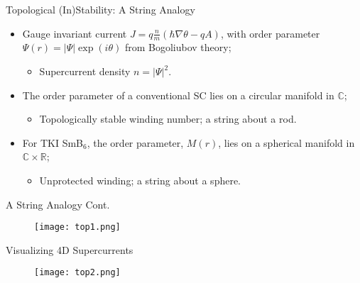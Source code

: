 \documentclass{beamer}
\begin{document}


\begin{frame}{Topological (In)Stability: A String Analogy}
    
    
    \begin{itemize}
        \item Gauge invariant current $J= q\frac{n}{m}(\hbar \nabla \theta -qA)$, with order parameter $\Psi(r) = |\Psi| \exp(i\theta)$ from Bogoliubov theory;
        \begin{itemize}
            \item Supercurrent density $n=|\Psi|^2$.
        \end{itemize}
        \item The order parameter of a conventional SC lies on a circular manifold in $\mathbb{C}$;
        \begin{itemize}
            \item Topologically stable winding number; a string about a rod.
        \end{itemize}
        
        \item For TKI SmB$_6$, the order parameter, $M(r)$, lies on a spherical manifold in $\mathbb{C}\times \mathbb{R}$;
        \begin{itemize}
            \item Unprotected winding; a string about a sphere.
        \end{itemize}
    \end{itemize}
    
    
\end{frame}




\begin{frame}{A String Analogy Cont.}
    
    \begin{figure}
    \centering
    \texttt{[image: top1.png]}
    \label{fig:top}
    \end{figure}
    
    
    
\end{frame}




\begin{frame}{Visualizing 4D Supercurrents}
    
    \begin{figure}[t!]
    \centering
    \texttt{[image: top2.png]}
    \label{fig:top}
    \end{figure}
    

\end{frame}
\end{document}
